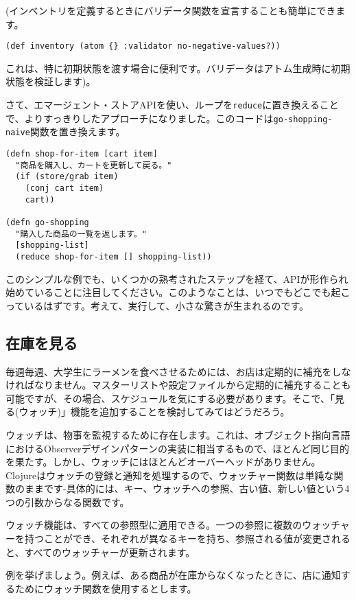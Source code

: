 (インベントリを定義するときにバリデータ関数を宣言することも簡単にできます。


\begin{lstlisting}[numbers=none]
(def inventory (atom {} :validator no-negative-values?))
\end{lstlisting}

これは、特に初期状態を渡す場合に便利です。バリデータはアトム生成時に初期状態を検証します)。

さて、エマージェント・ストアAPIを使い、ループを\texttt{reduce}に置き換えることで、よりすっきりしたアプローチになりました。このコードは\texttt{go-shopping-naive}関数を置き換えます。


\begin{lstlisting}[numbers=none]
(defn shop-for-item [cart item]
  "商品を購入し、カートを更新して戻る。"
  (if (store/grab item)
    (conj cart item)
    cart))

(defn go-shopping
  "購入した商品の一覧を返します。"
  [shopping-list]
  (reduce shop-for-item [] shopping-list))
\end{lstlisting}

このシンプルな例でも、いくつかの熟考されたステップを経て、APIが形作られ始めていることに注目してください。このようなことは、いつでもどこでも起こっているはずです。考えて、実行して、小さな驚きが生まれるのです。


\subsection{在庫を見る}

毎週毎週、大学生にラーメンを食べさせるためには、お店は定期的に補充をしなければなりません。マスターリストや設定ファイルから定期的に補充することも可能ですが、その場合、スケジュールを気にする必要があります。そこで、「見る(ウォッチ)」機能を追加することを検討してみてはどうだろう。

ウォッチは、物事を監視するために存在します。これは、オブジェクト指向言語におけるObserverデザインパターンの実装に相当するもので、ほとんど同じ目的を果たす。しかし、ウォッチにはほとんどオーバーヘッドがありません。Clojureはウォッチの登録と通知を処理するので、ウォッチャー関数は単純な関数のままです-具体的には、キー、ウォッチへの参照、古い値、新しい値という4つの引数からなる関数です。

ウォッチ機能は、すべての参照型に適用できる。一つの参照に複数のウォッチャーを持つことができ、それぞれが異なるキーを持ち、参照される値が変更されると、すべてのウォッチャーが更新されます。

例を挙げましょう。例えば、ある商品が在庫からなくなったときに、店に通知するためにウォッチ関数を使用するとします。


